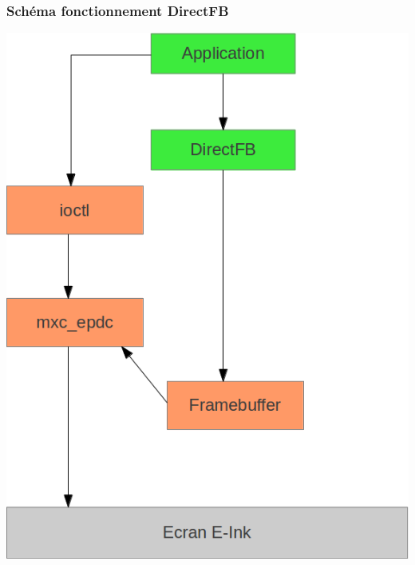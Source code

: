 \begin{frame}
\frametitle{Schéma fonctionnement DirectFB}

\begin{center}
\includegraphics[scale=0.3]{schema_direct_fb.png}
\end{center}

\end{frame}

